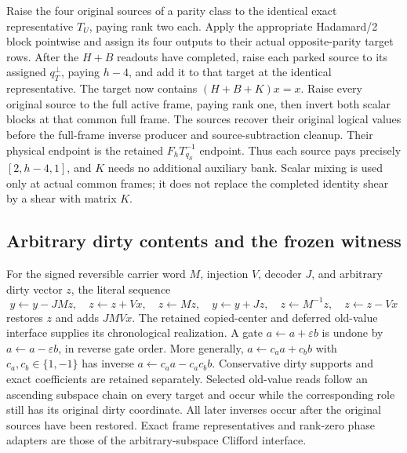 Raise the four original sources of a parity class to the identical exact
representative $T_U$, paying rank two each. Apply the appropriate
Hadamard/2 block pointwise and assign its four outputs to their actual
opposite-parity target rows. After the $H+B$ readouts have completed,
raise each parked source to its assigned $q_T^\perp$, paying $h-4$,
and add it to that target at the identical representative. The target
now contains $(H+B+K)x=x$.
Raise every original source to the full active frame, paying rank one,
then invert both scalar blocks at that common full frame.
The sources recover their original logical values before the full-frame
inverse producer and source-subtraction cleanup. Their physical endpoint
is the retained $F_hT_{q_S}^{-1}$ endpoint. Thus each source pays precisely
$[2,h-4,1]$, and $K$ needs no additional auxiliary bank.
Scalar mixing is used only at actual common frames; it does not replace
the completed identity shear by a shear with matrix $K$.

\subsection{Arbitrary dirty contents and the frozen witness}
For the signed reversible carrier word $M$, injection $V$, decoder $J$,
and arbitrary dirty vector $z$, the literal sequence
\[
 y\gets y-JMz,\quad z\gets z+Vx,\quad z\gets Mz,\quad
 y\gets y+Jz,\quad z\gets M^{-1}z,\quad z\gets z-Vx
\]
restores $z$ and adds $JMVx$. The retained copied-center and deferred
old-value interface supplies its chronological realization.
A gate $a\gets a+\varepsilon b$ is undone by
$a\gets a-\varepsilon b$, in reverse gate order. More generally,
$a\gets c_a a+c_b b$ with $c_a,c_b\in\{1,-1\}$ has inverse
$a\gets c_a a-c_a c_b b$. Conservative dirty supports and exact
coefficients are retained separately.
Selected old-value reads follow an ascending subspace chain on every
target and occur while the corresponding role still has its original
dirty coordinate. All later inverses occur after the original sources
have been restored. Exact frame representatives and rank-zero phase
adapters are those of the arbitrary-subspace Clifford interface.

